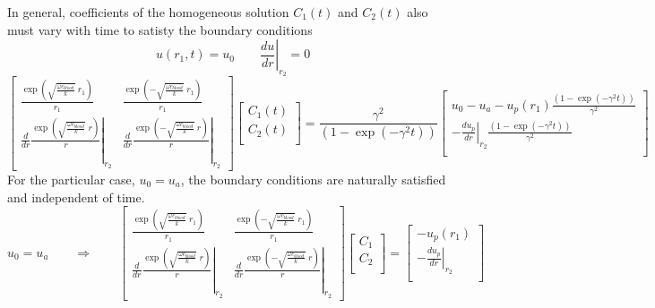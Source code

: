 \documentclass{article}         %
\theoremstyle{definition}
\theoremstyle{remark}
\begin{document}
In general,
coefficients of the homogeneous solution $C_1(t)$ and $C_2(t)$ also must vary with
time to satisty the boundary conditions
\[
 u(r_1,t) = u_0
  \qquad
 \left. \frac{d u}{dr} \right|_{r_2}  = 0
\]
\[
\begin{bmatrix}
    \frac{\exp\left( \sqrt{\frac{\omega c_\textit{blood}}{k}} \; r_1 \right)}{r_1}  
  & 
    \frac{\exp\left(-\sqrt{\frac{\omega c_\textit{blood}}{k}} \; r_1 \right)}{r_1}  
  \\
  \left.
   \frac{d}{dr}
    \frac{\exp\left( \sqrt{\frac{\omega c_\textit{blood}}{k}} \; r \right)}{r}  
  \right|_{r_2}
  & 
  \left.
   \frac{d}{dr}
    \frac{\exp\left(-\sqrt{\frac{\omega c_\textit{blood}}{k}} \; r \right)}{r}  
  \right|_{r_2}
\end{bmatrix}
\begin{bmatrix}
  C_1(t) \\
  C_2(t) \\
\end{bmatrix}
= 
 \frac{ \gamma^2}{\left( 1 - \exp(-\gamma^2 t)\right)}
\begin{bmatrix}
      u_0 - u_a - u_p(r_1)  
 \frac{\left( 1 - \exp(-\gamma^2 t)\right)}{ \gamma^2}  
   \\
  - \left. \frac{d u_p}{dr} 
  \right|_{r_2}
 \frac{\left( 1 - \exp(-\gamma^2 t)\right)}{ \gamma^2}  
\\
\end{bmatrix}
\]
For the particular case, $u_0=u_a$, the boundary conditions are naturally
satisfied and independent of time.
\[
u_0=u_a \qquad \Rightarrow \qquad
\begin{bmatrix}
    \frac{\exp\left( \sqrt{\frac{\omega c_\textit{blood}}{k}} \; r_1 \right)}{r_1}  
  & 
    \frac{\exp\left(-\sqrt{\frac{\omega c_\textit{blood}}{k}} \; r_1 \right)}{r_1}  
  \\
  \left.
   \frac{d}{dr}
    \frac{\exp\left( \sqrt{\frac{\omega c_\textit{blood}}{k}} \; r \right)}{r}  
  \right|_{r_2}
  & 
  \left.
   \frac{d}{dr}
    \frac{\exp\left(-\sqrt{\frac{\omega c_\textit{blood}}{k}} \; r \right)}{r}  
  \right|_{r_2}
\end{bmatrix}
\begin{bmatrix}
  C_1 \\
  C_2 \\
\end{bmatrix}
= 
\begin{bmatrix}
      - u_p(r_1)  
   \\
  - \left. \frac{d u_p}{dr} 
  \right|_{r_2}
\\
\end{bmatrix}
\]
\end{document}
